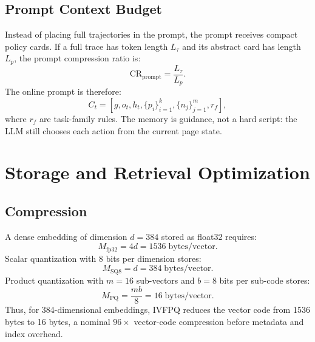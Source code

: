\documentclass[11pt]{article}
\begin{document}
\subsection{Prompt Context Budget}

Instead of placing full trajectories in the prompt, the prompt receives compact policy cards. If a full trace has token length $L_{\tau}$ and its abstract card has length $L_p$, the prompt compression ratio is:
\begin{equation}
  \mathrm{CR}_{\mathrm{prompt}}=\frac{L_{\tau}}{L_p}.
\end{equation}
The online prompt is therefore:
\begin{equation}
  C_t = \left[g, o_t, h_t, \{p_i\}_{i=1}^{k}, \{n_j\}_{j=1}^{m}, r_f\right],
\end{equation}
where $r_f$ are task-family rules. The memory is guidance, not a hard script: the LLM still chooses each action from the current page state.

\section{Storage and Retrieval Optimization}

\subsection{Compression}

A dense embedding of dimension $d=384$ stored as float32 requires:
\begin{equation}
  M_{\mathrm{fp32}} = 4d = 1536 \;\mathrm{bytes/vector}.
\end{equation}
Scalar quantization with 8 bits per dimension stores:
\begin{equation}
  M_{\mathrm{SQ8}} = d = 384 \;\mathrm{bytes/vector}.
\end{equation}
Product quantization with $m=16$ sub-vectors and $b=8$ bits per sub-code stores:
\begin{equation}
  M_{\mathrm{PQ}} = \frac{mb}{8}=16 \;\mathrm{bytes/vector}.
\end{equation}
Thus, for 384-dimensional embeddings, IVFPQ reduces the vector code from 1536 bytes to 16 bytes, a nominal $96\times$ vector-code compression before metadata and index overhead.
\end{document}
